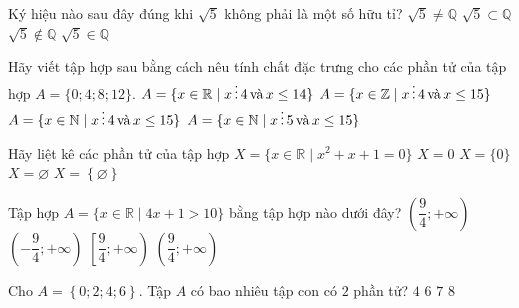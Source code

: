 \begin{ex}%
	Ký hiệu nào sau đây đúng khi $\sqrt{5}$ không phải là một số hữu  tỉ?
	 \choice
		{$\sqrt{5} \neq \mathbb{Q}$} 
		{$\sqrt{5}  \subset \mathbb{Q}$}
		{\True $\sqrt{5}  \notin \mathbb{Q}$}
		{$\sqrt{5} \in  \mathbb{Q}$}
\end{ex}

\begin{ex}%
	Hãy viết tập hợp sau bằng cách nêu tính chất đặc trưng cho các phần tử  của tập hợp $A=\{0;4;8;12\}$.
	\choice 
		{$A  = \{ x \in \mathbb{R} \mid x \,\vdots\, 4 \text{\,và\,} x \le 14 \}$}
		{$A = \{ x \in \mathbb{Z} \mid x \,\vdots\, 4 \text{\,và\,} x \le 15 \}$} 
		{\True $A = \{ x  \in \mathbb{N} \mid x \,\vdots\, 4\text{\,và\,} x \le 15 \}$}
		{$A = \{ x \in \mathbb{N} \mid x \,\vdots\, 5  \text{\,và\,} x \le 15 \}$}
\end{ex}

\begin{ex}%
	Hãy liệt kê các phần tử của tập hợp $X=\{x\in \mathbb{R}\mid  x^2+x+1=0\}$
	 \choice
		{$X=0$} 
		 {$X=\{0\}$}
		{\True  $X=\varnothing$}
		 {$X=\left\{\varnothing\right\}$}
\end{ex}

\begin{ex}%
	Tập  hợp $A=\{x\in \mathbb{R}\mid 4x+1>10 \}$ bằng tập hợp nào dưới đây?
	\choice 
		 {$\left(\dfrac{9}{4};+\infty\right)$}
		 {$\left(- \dfrac{9}{4};+\infty\right)$}
		{$\left[\dfrac{9}{4};+\infty\right)$} 
		 {\True $\left(\dfrac{9}{4};+\infty\right)$}
\end{ex}

\begin{ex}%
	Cho $A=\left\{0;2;4;6\right\}$. Tập $A$ có bao nhiêu tập  con có $2$ phần tử?
	\choice 
		 {$4$}
		 {\True $6$}
		 {$7$}
		{$8$} 
\end{ex}

